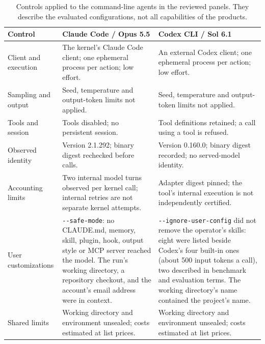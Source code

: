 \renewcommand{\thetable}{H.1}
\begin{longtable}{@{}P{1.25in}P{2.6in}P{2.6in}@{}}
\caption{Controls applied to the command-line agents in the reviewed panels. They describe
the evaluated configurations, not all capabilities of the products.}
\label{tab:cli-controls}\\
\toprule
\textbf{Control} & \textbf{Claude Code / Opus 5.5} & \textbf{Codex CLI / Sol 6.1}\\
\midrule\endfirsthead
\endhead\endfoot\endlastfoot
Client and execution & The kernel's Claude Code client; one ephemeral process per action; low effort. & An external Codex client; one ephemeral process per action; low effort.\\
Sampling and output & Seed, temperature and output-token limits not applied. & Seed, temperature and output-token limits not applied.\\
Tools and session & Tools disabled; no persistent session. & Tool definitions retained; a call using a tool is refused.\\
Observed identity & Version 2.1.292; binary digest rechecked before calls. & Version 0.160.0; binary digest recorded; no served-model identity.\\
Accounting limits & Two internal model turns observed per kernel call; internal retries are not separate kernel attempts. & Adapter digest pinned; the tool's internal execution is not independently certified.\\
User customizations & \verb|--safe-mode|: no CLAUDE.md, memory, skill, plugin, hook, output style or MCP server reached the model. The run's working directory, a repository checkout, and the account's email address were in context. & \verb|--ignore-user-config| did not remove the operator's skills: eight were listed beside Codex's four built-in ones (about 500 input tokens a call), two described in benchmark and evaluation terms. The working directory's name contained the project's name.\\
Shared limits & Working directory and environment unsealed; costs estimated at list prices. & Working directory and environment unsealed; costs estimated at list prices.\\
\end{longtable}
